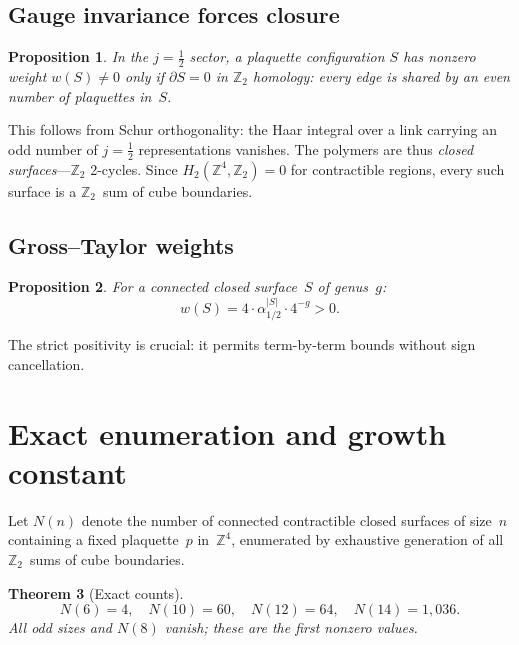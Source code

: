 \documentclass[12pt,a4paper]{article}
\newtheorem{theorem}{Theorem}[section]
\newtheorem{proposition}[theorem]{Proposition}
\newcommand{\Z}{\mathbb{Z}}
\newcommand{\half}{\tfrac{1}{2}}
\begin{document}
\subsection{Gauge invariance forces closure}

\begin{proposition}\label{prop:closure}
In the $j=\half$ sector, a plaquette configuration $S$ has nonzero weight $w(S)\ne 0$ only if $\partial S=0$ in $\Z_2$ homology: every edge is shared by an even number of plaquettes in~$S$.
\end{proposition}

This follows from Schur orthogonality: the Haar integral over a link carrying an odd number of $j=\half$ representations vanishes. The polymers are thus \emph{closed surfaces}---$\Z_2$ 2-cycles. Since $H_2(\Z^4,\Z_2)=0$ for contractible regions, every such surface is a $\Z_2$~sum of cube boundaries.

\subsection{Gross--Taylor weights}

\begin{proposition}\label{prop:weight}
For a connected closed surface~$S$ of genus~$g$:
\begin{equation}
w(S) = 4\cdot\alpha_{1/2}^{|S|}\cdot 4^{-g} > 0.
\end{equation}
\end{proposition}

The strict positivity is crucial: it permits term-by-term bounds without sign cancellation.

\section{Exact enumeration and growth constant}\label{sec:enum}

Let $N(n)$ denote the number of connected contractible closed surfaces of size~$n$ containing a fixed plaquette~$p$ in~$\Z^4$, enumerated by exhaustive generation of all $\Z_2$~sums of cube boundaries.

\begin{theorem}[Exact counts]\label{thm:counts}
\begin{equation}
N(6)=4,\quad N(10)=60,\quad N(12)=64,\quad N(14)=1{,}036.
\end{equation}
All odd sizes and $N(8)$ vanish; these are the first nonzero values.
\end{theorem}
\end{document}
